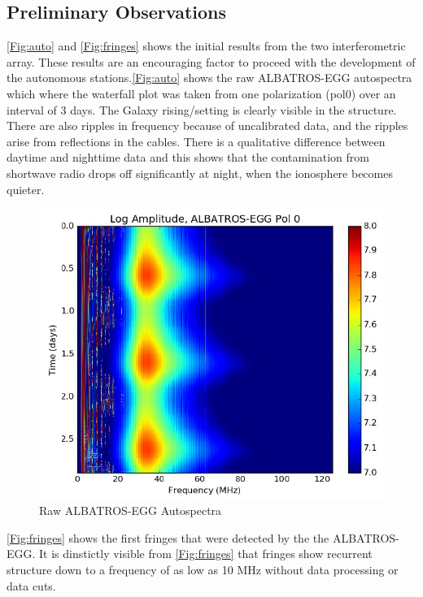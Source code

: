 \documentclass{ws-jai}
\begin{document}
 \subsection{Preliminary Observations}
	
\autoref{Fig:auto} and \autoref{Fig:fringes} shows the initial results from the two interferometric array. These results are an encouraging factor to proceed with the development of the autonomous stations.\autoref{Fig:auto} shows the raw ALBATROS-EGG autospectra which where the waterfall plot was taken from one polarization (pol0) over an interval of 3 days. The Galaxy rising/setting is clearly visible in the structure. There are also ripples in frequency because of uncalibrated data, and the ripples arise from reflections in the cables. There is a qualitative difference between daytime and nighttime data and this shows that the contamination from shortwave radio drops off significantly at night, when the ionosphere becomes quieter.

\begin{figure}[h!]
	\begin{center}
		\includegraphics[width=0.8\linewidth]{Figures/Raw-ALBATROS-autospectra.PNG}
		\caption{Raw ALBATROS-EGG Autospectra}
		\label{Fig:auto}
	\end{center}
\end{figure}

\autoref{Fig:fringes} shows the first fringes that were detected by the the ALBATROS-EGG. It is dinstictly visible from \autoref{Fig:fringes} that fringes show recurrent structure down to a frequency of as low as 10 MHz without data processing or data cuts.
\end{document}

